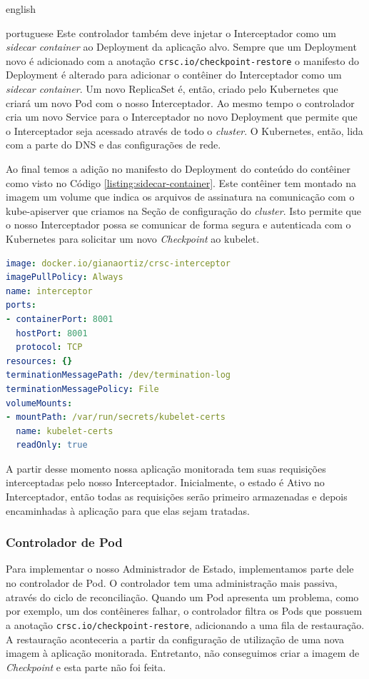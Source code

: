 \begin{otherlanguage*}{english}
\begin{otherlanguage*}{portuguese}
Este controlador também deve injetar o Interceptador como um \textit{sidecar container}
ao Deployment da aplicação alvo. Sempre que um Deployment novo é adicionado com a 
anotação \texttt{crsc.io/checkpoint-restore} o manifesto do Deployment é alterado
para adicionar o contêiner do Interceptador como um \textit{sidecar container}. Um novo
ReplicaSet é, então, criado pelo Kubernetes que criará um novo Pod com o nosso
Interceptador. Ao mesmo tempo o controlador cria um novo Service para o Interceptador no
novo Deployment que permite que o Interceptador seja acessado através de todo o \textit{cluster}. O
Kubernetes, então, lida com a parte do DNS e das configurações de rede.

Ao final temos a adição no manifesto do Deployment do conteúdo do contêiner como visto no
Código \ref{listing:sidecar-container}. Este contêiner tem montado na imagem um volume
que indica os arquivos de assinatura na comunicação com o kube-apiserver que criamos na
Seção de configuração do \textit{cluster}. Isto permite que o nosso Interceptador possa
se comunicar de forma segura e autenticada com o Kubernetes para solicitar um novo
\textit{Checkpoint} ao kubelet.

\begin{lstlisting}[language=yaml,caption={Configuração do Interceptador para o Deployment da aplicação alvo como sidecar container.},label={listing:sidecar-container}]
image: docker.io/gianaortiz/crsc-interceptor
imagePullPolicy: Always
name: interceptor
ports:
- containerPort: 8001
  hostPort: 8001
  protocol: TCP
resources: {}
terminationMessagePath: /dev/termination-log
terminationMessagePolicy: File
volumeMounts:
- mountPath: /var/run/secrets/kubelet-certs
  name: kubelet-certs
  readOnly: true
\end{lstlisting}

A partir desse momento nossa aplicação monitorada tem suas requisições interceptadas
pelo nosso Interceptador. Inicialmente, o estado é Ativo no Interceptador, então todas
as requisições serão primeiro armazenadas e depois encaminhadas à aplicação para que
elas sejam tratadas.

\subsubsection{Controlador de Pod}

Para implementar o nosso Administrador de Estado, implementamos parte dele no controlador
de Pod. O controlador tem uma administração mais passiva, através do ciclo de
reconciliação. Quando um Pod apresenta um problema, como por exemplo, um dos contêineres
falhar, o controlador filtra os Pods que possuem a anotação
\texttt{crsc.io/checkpoint-restore}, adicionando a uma fila de restauração.
A restauração aconteceria a partir da configuração de utilização de uma nova
imagem à aplicação monitorada. Entretanto, não conseguimos criar a imagem de
\textit{Checkpoint} e esta parte não foi feita.


\end{otherlanguage*}
\end{otherlanguage*}

